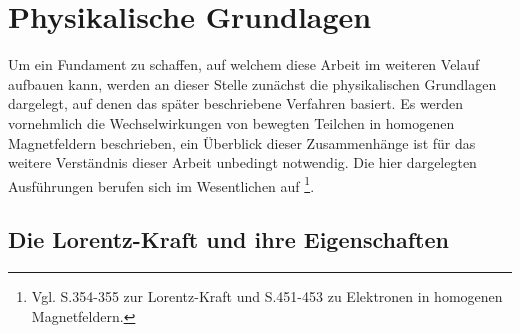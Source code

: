 \chapter{Physikalische Grundlagen}

Um ein Fundament zu schaffen, auf welchem diese Arbeit im weiteren Velauf aufbauen kann, werden
an dieser Stelle zun\"achst die physikalischen Grundlagen dargelegt, auf denen das sp\"ater beschriebene
Verfahren basiert. Es werden vornehmlich die Wechselwirkungen von bewegten Teilchen in homogenen
Magnetfeldern beschrieben, ein \"Uberblick dieser Zusammenh\"ange ist f\"ur das weitere Verst\"andnis
dieser Arbeit unbedingt notwendig. Die hier dargelegten Ausf\"uhrungen berufen sich im Wesentlichen auf \cite{Vog99}
\footnote{Vgl. S.354-355 zur Lorentz-Kraft und S.451-453 zu Elektronen in homogenen Magnetfeldern.}.

\section{Die Lorentz-Kraft und ihre Eigenschaften}

